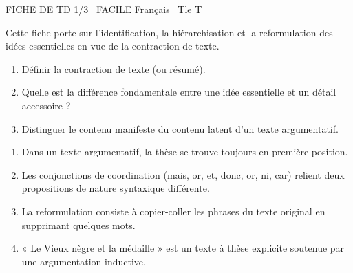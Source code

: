 \documentclass[11pt]{article}
\begin{document}
\begin{tcolorbox}[enhanced,colback=popink,colframe=popink,arc=10pt,boxrule=0pt,left=12pt,right=12pt,top=9pt,bottom=9pt]
{\color{white}\popxbold\small FICHE DE TD 1/3 \textbullet\ FACILE \hfill Français \textbullet\ Tle T\par}
\end{tcolorbox}
\vspace{4pt}
Cette fiche porte sur l'identification, la hiérarchisation et la reformulation des idées essentielles en vue de la contraction de texte.

\begin{exercice}
\begin{enumerate}
    \item Définir la contraction de texte (ou résumé).
    \item Quelle est la différence fondamentale entre une idée essentielle et un détail accessoire ?
    \item Distinguer le contenu manifeste du contenu latent d'un texte argumentatif.
\end{enumerate}
\end{exercice}

\begin{exercice}
\begin{enumerate}
    \item Dans un texte argumentatif, la thèse se trouve toujours en première position.
    \item Les conjonctions de coordination (mais, or, et, donc, or, ni, car) relient deux propositions de nature syntaxique différente.
    \item La reformulation consiste à copier-coller les phrases du texte original en supprimant quelques mots.
    \item « Le Vieux nègre et la médaille » est un texte à thèse explicite soutenue par une argumentation inductive.
\end{enumerate}
\end{exercice}
\end{document}
